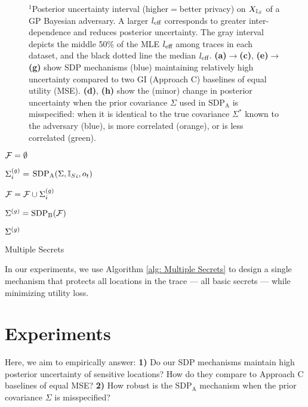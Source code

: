 \begin{figure*}[h]
\begin{subfigure}{.24\linewidth}
    \end{subfigure}
    \caption[Posterior uncertainty interval (higher$=$better privacy) on $\Xs$ of a GP Bayesian adversary.]{$^1$Posterior uncertainty interval (higher$=$better privacy) on $\Xs$ of a GP Bayesian adversary. A larger $l_{\text{eff}}$ corresponds to greater inter-dependence and reduces posterior uncertainty. The gray interval depicts the middle 50\% of the MLE $l_{\text{eff}}$ among traces in each dataset, and the black dotted line the median $l_{\text{eff}}$. \textbf{(a)}$\rightarrow$\textbf{(c)}, \textbf{(e)}$\rightarrow$\textbf{(g)} show SDP mechanisms (blue) maintaining relatively high uncertainty compared to two GI (Approach C) baselines of equal utility (MSE). \textbf{(d)}, \textbf{(h)} show the (minor) change in posterior uncertainty when the prior covariance $\Sigma$  used in $\text{SDP}_{\text{A}}$ is misspecified: when it is identical to the true covariance $\Sigma^*$ known to the adversary (blue), is more correlated (orange), or is less correlated (green).
    }
    \label{fig: experiments}
\end{figure*} 


\begin{algorithm}
		\SetAlgoLined
		\KwOutput{$\Sigmag$}
			\vskip 1mm
			$\mathcal{F} = \emptyset$\;
			
			{
				$\Sigma^{(g)}_i =$ $\text{SDP}_\text{A}(\Sigma, {\mathbb{I}_S}_i, o_t)$\; 
				
				$\mathcal{F} = \mathcal{F} \cup \Sigma^{(g)}_i$\;
			}
			\vskip 1mm
			$\Sigma^{(g)}= \text{SDP}_{\text{B}}(\mathcal{F})$\;
			
			\Return $\Sigmag$\;
		\caption{Multiple Secrets}
\label{alg: Multiple Secrets}
\end{algorithm}
In our experiments, we use Algorithm \ref{alg: Multiple Secrets} to design a single mechanism that protects all locations in the trace --- all basic secrets --- while minimizing utility loss.





\section{Experiments}
\label{sec: experiments}
Here, we aim to empirically answer: \textbf{1)} 
Do our SDP mechanisms maintain high posterior uncertainty of sensitive locations? How do they compare to Approach C baselines of equal MSE? 
\textbf{2)} How robust is the $\text{SDP}_\text{A}$ mechanism when the prior covariance $\Sigma$ is misspecified? 

